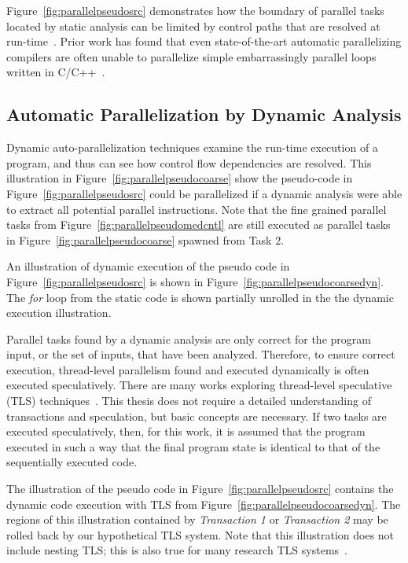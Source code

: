 {Figure~\ref{fig:parallelpseudosrc} demonstrates how the boundary of parallel tasks located by static analysis can be limited by control paths that are resolved at run-time~\cite{blume:1992:pds}.  Prior work has found that even state-of-the-art automatic parallelizing compilers are often unable to parallelize simple embarrassingly parallel loops written in C/C++~\cite{minjang:10:micro}.

\subsection{Automatic Parallelization by Dynamic Analysis}

Dynamic auto-parallelization techniques examine the run-time execution of a program, and thus can see how control flow dependencies are resolved. This illustration in Figure~\ref{fig:parallelpseudocoarse} show the pseudo-code in Figure~\ref{fig:parallelpseudosrc} could be parallelized if a dynamic analysis were able to extract all potential parallel instructions.  Note that the fine grained parallel tasks from Figure~\ref{fig:parallelpseudomedcntl} are still executed as parallel tasks in Figure~\ref{fig:parallelpseudocoarse} spawned from Task 2.

An illustration of dynamic execution of the pseudo code in Figure~\ref{fig:parallelpseudosrc} is shown in Figure~\ref{fig:parallelpseudocoarsedyn}.  The \textit{for} loop from the static code is shown partially unrolled in the the dynamic execution illustration.

Parallel tasks found by a dynamic analysis are only correct for the program input, or the set of inputs, that have been analyzed. Therefore, to ensure correct execution, thread-level parallelism found and executed dynamically is often executed speculatively. There are many works exploring thread-level speculative (TLS) techniques~\cite{steffan:00:isca,vachharajani:07:pact,warg:2001:pact,wu:2008:cdp,chen:cc:2004,dou:2007:trans,wang:2009:dps,Rangan:2004kx,Ottoni:2005uq}. This thesis does not require a detailed understanding of transactions and speculation, but basic concepts are necessary.  If two tasks are executed speculatively, then, for this work, it is assumed that the program executed in such a way that the final program state is identical to that of the sequentially executed code.

The illustration of the pseudo code in Figure~\ref{fig:parallelpseudosrc} contains the dynamic code execution with TLS from Figure~\ref{fig:parallelpseudocoarsedyn}.  The regions of this illustration contained by \textit{Transaction 1} or \textit{Transaction 2} may be rolled back by our hypothetical TLS system.  Note that this illustration does not include nesting TLS; this is also true for many research TLS systems~\cite{prabhu:2005:ppopp}.

}
